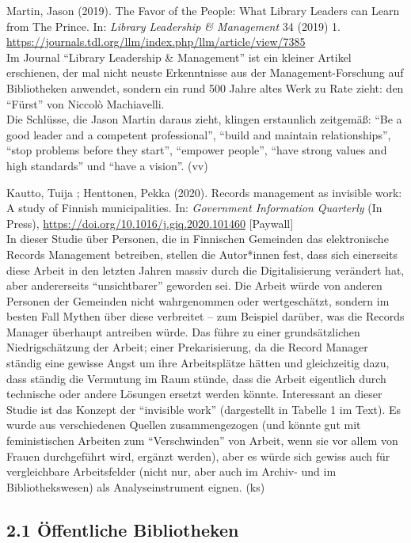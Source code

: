 \documentclass[a4paper,
fontsize=11pt,
oneside,
numbers=noperiodatend,
parskip=half-,
bibliography=totoc,
final
]{scrartcl}
\begin{document}
Martin, Jason (2019). The Favor of the People: What Library Leaders can
Learn from The Prince. In: \emph{Library Leadership \& Management} 34
(2019) 1.
\url{https://journals.tdl.org/llm/index.php/llm/article/view/7385}\\
Im Journal ``Library Leadership \& Management'' ist ein kleiner Artikel
erschienen, der mal nicht neuste Erkenntnisse aus der
Management-Forschung auf Bibliotheken anwendet, sondern ein rund 500
Jahre altes Werk zu Rate zieht: den ``Fürst'' von Niccolò Machiavelli.\\
Die Schlüsse, die Jason Martin daraus zieht, klingen erstaunlich
zeitgemäß: ``Be a good leader and a competent professional'', ``build
and maintain relationships'', ``stop problems before they start'',
``empower people'', ``have strong values and high standards'' und ``have
a vision''. (vv)

Kautto, Tuija ; Henttonen, Pekka (2020). Records management as invisible
work: A study of Finnish municipalities. In: \emph{Government
Information Quarterly} (In Press),
\url{https://doi.org/10.1016/j.giq.2020.101460} {[}Paywall{]}\\
In dieser Studie über Personen, die in Finnischen Gemeinden das
elektronische Records Management betreiben, stellen die Autor*innen
fest, dass sich einerseits diese Arbeit in den letzten Jahren massiv
durch die Digitalisierung verändert hat, aber andererseits
``unsichtbarer'' geworden sei. Die Arbeit würde von anderen Personen der
Gemeinden nicht wahrgenommen oder wertgeschätzt, sondern im besten Fall
Mythen über diese verbreitet -- zum Beispiel darüber, was die Records
Manager überhaupt antreiben würde. Das führe zu einer grundsätzlichen
Niedrigschätzung der Arbeit; einer Prekarisierung, da die Record Manager
ständig eine gewisse Angst um ihre Arbeitsplätze hätten und gleichzeitig
dazu, dass ständig die Vermutung im Raum stünde, dass die Arbeit
eigentlich durch technische oder andere Lösungen ersetzt werden könnte.
Interessant an dieser Studie ist das Konzept der ``invisible work''
(dargestellt in Tabelle 1 im Text). Es wurde aus verschiedenen Quellen
zusammengezogen (und könnte gut mit feministischen Arbeiten zum
``Verschwinden'' von Arbeit, wenn sie vor allem von Frauen durchgeführt
wird, ergänzt werden), aber es würde sich gewiss auch für vergleichbare
Arbeitsfelder (nicht nur, aber auch im Archiv- und im Bibliothekswesen)
als Analyseinstrument eignen. (ks)

\hypertarget{uxf6ffentliche-bibliotheken}{%
\subsection{2.1 Öffentliche
Bibliotheken}\label{uxf6ffentliche-bibliotheken}}
\end{document}
